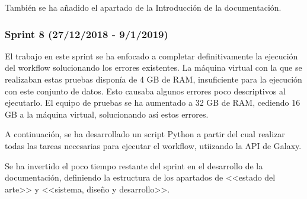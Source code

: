 También se ha añadido el apartado de la Introducción de la documentación.

\subsubsection{Sprint 8 (27/12/2018 - 9/1/2019)}
El trabajo en este sprint se ha enfocado a completar definitivamente la ejecución del workflow solucionando los errores existentes. La máquina virtual con la que se realizaban estas pruebas disponía de 4 GB de RAM, insuficiente para la ejecución con este conjunto de datos. Esto causaba algunos errores poco descriptivos al ejecutarlo. El equipo de pruebas se ha aumentado a 32 GB de RAM, cediendo 16 GB a la máquina virtual, solucionando así estos errores.

A continuación, se ha desarrollado un script Python a partir del cual realizar todas las tareas necesarias para ejecutar el workflow, utiizando la API de Galaxy.

Se ha invertido el poco tiempo restante del sprint en el desarrollo de la documentación, definiendo la estructura de los apartados de <<estado del arte>> y <<sistema, diseño y desarrollo>>.
\newpage \thispagestyle{empty} %